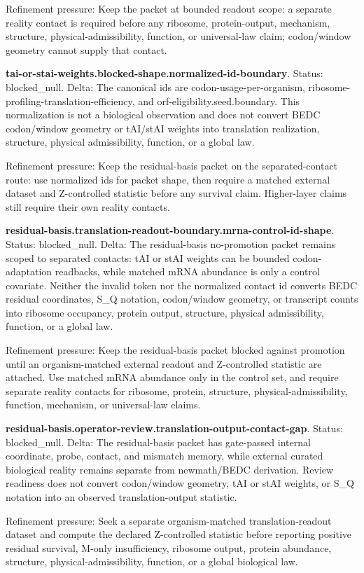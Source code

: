 Refinement pressure: Keep the packet at bounded readout scope: a separate reality contact is required before any ribosome, protein-output, mechanism, structure, physical-admissibility, function, or universal-law claim; codon/window geometry cannot supply that contact.

\textbf{tai-or-stai-weights.blocked-shape.normalized-id-boundary}. Status: blocked\_null. Delta: The canonical ids are codon-usage-per-organism, ribosome-profiling-translation-efficiency, and orf-eligibility.seed.boundary. This normalization is not a biological observation and does not convert BEDC codon/window geometry or tAI/stAI weights into translation realization, structure, physical admissibility, function, or a global law.

Refinement pressure: Keep the residual-basis packet on the separated-contact route: use normalized ids for packet shape, then require a matched external dataset and Z-controlled statistic before any survival claim. Higher-layer claims still require their own reality contacts.

\textbf{residual-basis.translation-readout-boundary.mrna-control-id-shape}. Status: blocked\_null. Delta: The residual-basis no-promotion packet remains scoped to separated contacts: tAI or stAI weights can be bounded codon-adaptation readbacks, while matched mRNA abundance is only a control covariate. Neither the invalid token nor the normalized contact id converts BEDC residual coordinates, S\_Q notation, codon/window geometry, or transcript counts into ribosome occupancy, protein output, structure, physical admissibility, function, or a global law.

Refinement pressure: Keep the residual-basis packet blocked against promotion until an organism-matched external readout and Z-controlled statistic are attached. Use matched mRNA abundance only in the control set, and require separate reality contacts for ribosome, protein, structure, physical-admissibility, function, mechanism, or universal-law claims.

\textbf{residual-basis.operator-review.translation-output-contact-gap}. Status: blocked\_null. Delta: The residual-basis packet has gate-passed internal coordinate, probe, contact, and mismatch memory, while external curated biological reality remains separate from newmath/BEDC derivation. Review readiness does not convert codon/window geometry, tAI or stAI weights, or S\_Q notation into an observed translation-output statistic.

Refinement pressure: Seek a separate organism-matched translation-readout dataset and compute the declared Z-controlled statistic before reporting positive residual survival, M-only insufficiency, ribosome output, protein abundance, structure, physical-admissibility, function, or a global biological law.

